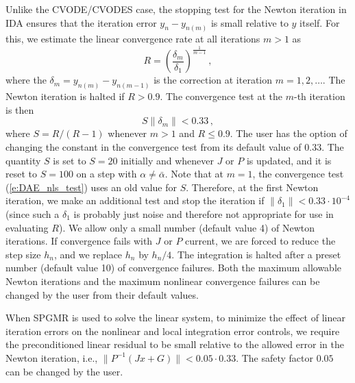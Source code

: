 Unlike the CVODE/CVODES case, the stopping test for the Newton iteration
in IDA ensures that the iteration error $y_n - y_{n(m)}$ is small relative
to $y$ itself. For this, we estimate the linear convergence rate at all 
iterations $m>1$ as
\begin{equation*}
R = \left( \frac{\delta_m}{\delta_1} \right)^{\frac{1}{m-1}} \, , 
\end{equation*}
where the $\delta_m = y_{n(m)} - y_{n(m-1)}$ is the correction at
iteration $m=1,2,\ldots$. The Newton iteration is halted if $R>0.9$.
The convergence test at the $m$-th iteration is then
\begin{equation}\label{e:DAE_nls_test}
S \| \delta_m \| < 0.33 \, ,
\end{equation}
where $S = R/(R-1)$ whenever $m>1$ and $R\le 0.9$. The user has the
option of changing the constant in the convergence test from its default 
value of $0.33$.
%
The quantity $S$ is set to $S=20$ initially and whenever $J$ or $P$ is
updated, and it is reset to $S=100$ on a step with $\alpha \neq \bar\alpha$.
Note that at $m=1$, the convergence test (\ref{e:DAE_nls_test}) uses an old 
value for $S$. Therefore, at the first Newton iteration, we make an additional
test and stop the iteration if $\|\delta_1\| < 0.33 \cdot 10^{-4}$
(since such a $\delta_1$ is probably just noise and therefore not appropriate 
for use in evaluating $R$).
%
We allow only a small number (default value 4) of Newton iterations.
If convergence fails with $J$ or $P$ current, 
we are forced to reduce the step size $h_n$, and we replace $h_n$ by $h_n/4$.
The integration is halted after a preset number (default value 10)
of convergence failures. Both the maximum allowable Newton iterations
and the maximum nonlinear convergence failures can be changed by the user
from their default values.

When SPGMR is used to solve the linear system, to minimize the effect of
linear iteration errors on the nonlinear and local integration error controls,
we require the preconditioned linear residual to be small relative to the 
allowed error in the Newton iteration, i.e., 
$\| P^{-1}(Jx+G) \| < 0.05 \cdot 0.33$.
The safety factor $0.05$ can be changed by the user.

